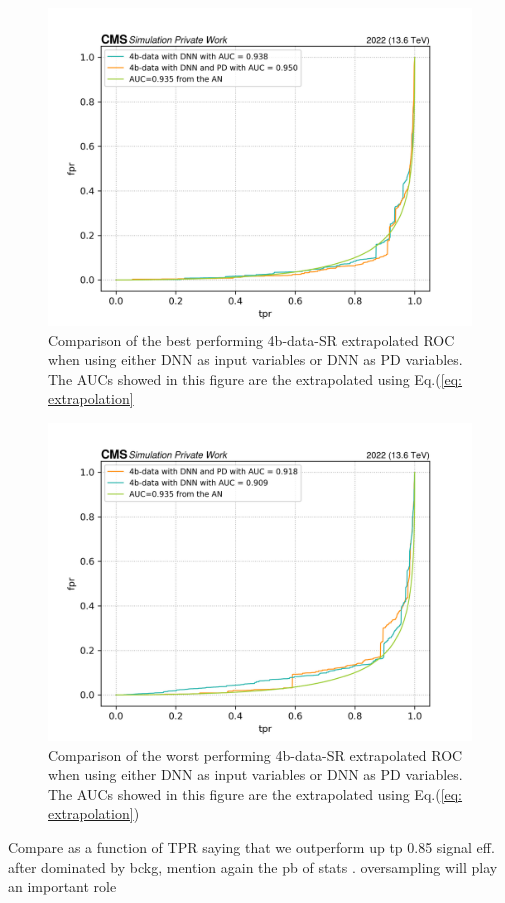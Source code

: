 \begin{figure}[hbt]
    \centering
    \includegraphics[width=0.7\linewidth]{Images/7.S:B/SR stats/HIghest AUC ROC vs Highest AUC vs AN.png}
    \caption{Comparison of the best performing 4b-data-SR extrapolated ROC when using either DNN as input variables or DNN as PD variables. The AUCs showed in this figure are the extrapolated using Eq.(\ref{eq: extrapolation}}
    \label{fig: highest comp}
\end{figure}

\begin{figure}[hbt]
    \centering
    \includegraphics[width=0.7\linewidth]{Images/7.S:B/SR stats/lowest comp 4b data.png}
    \caption{Comparison of the worst performing 4b-data-SR extrapolated ROC when using either DNN as input variables or DNN as PD variables. The AUCs showed in this figure are the extrapolated using Eq.(\ref{eq: extrapolation})}
    \label{fig: lowest comp}
\end{figure}


Compare as a function of TPR saying that we outperform up tp 0.85 signal eff. after dominated by bckg, mention again the pb of stats . oversampling will play an important role